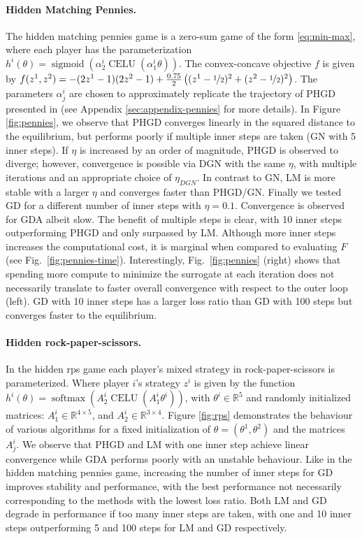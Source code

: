 \documentclass{article} %
\theoremstyle{definition}
\newcommand{\reals}{\mathbb{R}}
\newcommand{\sigmoid}{\operatorname{sigmoid}}
\newcommand{\softmax}{\operatorname{softmax}}
\newcommand{\celu}{\operatorname{CELU}}
\begin{document}
\paragraph{Hidden Matching Pennies.} The hidden matching pennies game is a zero-sum game of the form \eqref{eq:min-max}, where each player has the parameterization $h^i(\theta) = \sigmoid(\alpha_2^i\celu(\alpha^i_1 \theta))$.
The convex-concave objective $f$ is given by $f(z^1,z^2)= -(2z^1-1)(2z^2-1)+\frac{0.75}{2}\left((z^1-\nicefrac{1}{2})^2 + (z^2-\nicefrac{1}{2})^2\right)$.
The parameters $\alpha_j^i$ are chosen to approximately replicate the trajectory of PHGD presented in \citet[Figure 4]{sakos2024exploiting} (see Appendix \ref{sec:appendix-pennies} for more details).
In Figure \ref{fig:pennies}, we observe that PHGD converges linearly in the squared distance to the equilibrium, but performs poorly if multiple inner steps are taken (GN with 5 inner steps). 
If $\eta$ is increased by an order of magnitude, PHGD is observed to diverge; however, convergence is possible via DGN with the same $\eta$, with multiple iterations and an appropriate choice of $\eta_{DGN}$.
In contrast to GN, LM is more stable with a larger $\eta$ and converges faster than PHGD/GN. 
Finally we tested GD for a different number of inner steps with $\eta=0.1$.
Convergence is observed for GDA albeit slow.
The benefit of multiple steps is clear, with 10 inner steps outperforming PHGD and only surpassed by LM.
Although more inner steps increases the computational cost, it is marginal when compared to evaluating $F$ (see Fig.~\ref{fig:pennies-time}).
Interestingly, Fig.~\ref{fig:pennies} (right) shows that spending more compute to minimize the surrogate at each iteration does not necessarily translate to faster overall convergence with respect to the outer loop (left).
GD with 10 inner steps has a larger loss ratio than GD with 100 steps but converges faster to the equilibrium.

\paragraph{Hidden rock-paper-scissors.} In the hidden rps game each player's mixed strategy in rock-paper-scissors is parameterized. 
Where player $i$'s strategy $z^i$ is given by the function $h^i(\theta) = \softmax(A_2^i \celu(A_1^i \theta^i))$, with  $\theta^i \in \reals^5$ and randomly initialized matrices: $A_1^i \in \reals^{4 \times 5}$, and $A_2^i \in \reals^{3 \times 4}$.
Figure \ref{fig:rps} demonstrates the behaviour of various algorithms for a fixed initialization of $\theta = (\theta^1, \theta^2)$ and the matrices $A^i_j$. 
We observe that PHGD and LM with one inner step achieve linear convergence while GDA performs poorly with an unstable behaviour.
Like in the hidden matching pennies game, increasing the number of inner steps for GD improves stability and performance, with the best performance not necessarily corresponding to the methods with the lowest loss ratio.
Both LM and GD degrade in performance if too many inner steps are taken, with one and 10 inner steps outperforming 5 and 100 steps for LM and GD respectively.
\end{document}
